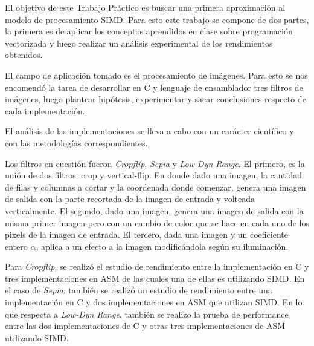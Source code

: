 El objetivo de este Trabajo Práctico es buscar una primera aproximación al modelo de procesamiento SIMD. Para esto este trabajo se compone de dos partes, la primera es de aplicar los conceptos aprendidos en clase sobre programación vectorizada y luego realizar un análisis experimental de los rendimientos obtenidos.

El campo de aplicación tomado es el procesamiento de imágenes. Para esto se nos encomendó la tarea de desarrollar en C y lenguaje de ensamblador tres filtros de imágenes, luego plantear hipótesis, experimentar y sacar conclusiones respecto de cada implementación.

El análisis de las implementaciones se lleva a cabo con un carácter científico y con las metodologías correspondientes.

Los filtros en cuestión fueron \textit{Cropflip}, \textit{Sepia} y \textit{Low-Dyn Range}.
El primero, es la unión de dos filtros: crop y vertical-flip. En donde dado una imagen, la cantidad de filas y columnas a cortar y la coordenada donde comenzar, genera una imagen de salida con la parte recortada de la imagen de entrada y volteada verticalmente.
El segundo, dado una imagen, genera una imagen de salida con la misma primer imagen pero con un cambio de color que se hace en cada uno de los pixels de la imagen de entrada. El tercero, dada una imagen y un coeficiente entero $\alpha$, aplica a un efecto a la imagen modificándola según su iluminación.

Para \textit{Cropflip}, se realizó el estudio de rendimiento entre la implementación en C y tres implementaciones en ASM de las cuales una de ellas es utilizando SIMD.
En el caso de \textit{Sepia}, también se realizó un estudio de rendimiento entre una implementación en C y dos implementaciones en ASM que utilizan SIMD.
En lo que respecta a \textit{Low-Dyn Range}, también se realizo la prueba de performance entre las dos implementaciones de C y otras tres implementaciones de ASM utilizando SIMD.
